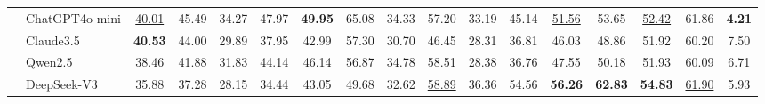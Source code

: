 \begin{table*}[ht]
{\begin{tabular}{ll|cc|cc|cc|cc|cc|cc|cc|c}
& ChatGPT4o-mini & \underline{40.01} & 45.49 & 34.27 & 47.97 & \textbf{49.95} & 65.08 & 34.33 & 57.20 & 33.19 & 45.14 & \underline{51.56} & 53.65 & \underline{52.42} & 61.86 & \textbf{4.21} \\
& Claude3.5 & \textbf{40.53} & 44.00 & 29.89 & 37.95 & 42.99 & 57.30 & 30.70 & 46.45 & 28.31 & 36.81 & 46.03 & 48.86 & 51.92 & 60.20 & 7.50 \\
& Qwen2.5 & 38.46 & 41.88 & 31.83 & 44.14 & 46.14 & 56.87 & \underline{34.78} & 58.51 & 28.38 & 36.76 & 47.55 & 50.18 & 51.93 & 60.09 & 6.71 \\
& DeepSeek-V3 & 35.88 & 37.28 & 28.15 & 34.44 & 43.05 & 49.68 & 32.62 & \underline{58.89} & 36.36 & 54.56 & \textbf{56.26} & \textbf{62.83} & \textbf{54.83} & \underline{61.90} & 5.93 \\
\bottomrule
\end{tabular}
}
\end{table*}